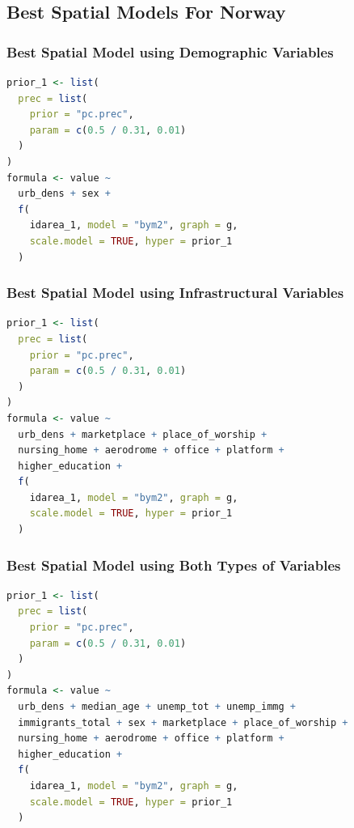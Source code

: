 \subsection{Best Spatial Models For Norway}
\subsubsection{Best Spatial Model using Demographic Variables}
\begin{lstlisting}[caption={The code for the demographic model.}, label={codeDemoNorway}, language = R]
prior_1 <- list(
  prec = list(
    prior = "pc.prec",
    param = c(0.5 / 0.31, 0.01)
  )
)
formula <- value ~
  urb_dens + sex +
  f(
    idarea_1, model = "bym2", graph = g,
    scale.model = TRUE, hyper = prior_1
  )
\end{lstlisting}
\subsubsection{Best Spatial Model using Infrastructural Variables}
\begin{lstlisting}[caption={The code for the infrastructural model.}, label={codeInfraNorway}, language = R]
prior_1 <- list(
  prec = list(
    prior = "pc.prec",
    param = c(0.5 / 0.31, 0.01)
  )
)
formula <- value ~
  urb_dens + marketplace + place_of_worship +
  nursing_home + aerodrome + office + platform +
  higher_education +
  f(
    idarea_1, model = "bym2", graph = g,
    scale.model = TRUE, hyper = prior_1
  )
\end{lstlisting}
\subsubsection{Best Spatial Model using Both Types of Variables}
\begin{lstlisting}[caption={The code for the demographic + infrastructure model.}, label={codeBothNorway}, language=R]
prior_1 <- list(
  prec = list(
    prior = "pc.prec",
    param = c(0.5 / 0.31, 0.01)
  )
)
formula <- value ~
  urb_dens + median_age + unemp_tot + unemp_immg +
  immigrants_total + sex + marketplace + place_of_worship + 
  nursing_home + aerodrome + office + platform +
  higher_education +
  f(
    idarea_1, model = "bym2", graph = g,
    scale.model = TRUE, hyper = prior_1
  )
\end{lstlisting}
\clearpage
